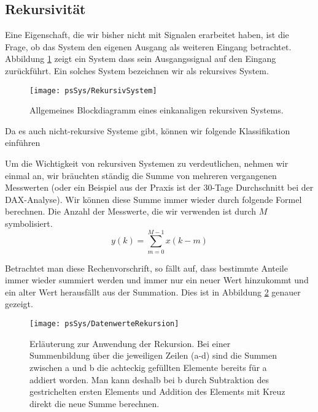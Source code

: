

\subsection{Rekursivität \label{ssec:Rekursion}}
Eine Eigenschaft, die wir bisher nicht mit Signalen erarbeitet
haben, ist die Frage, ob das System den eigenen Ausgang als
weiteren Eingang betrachtet. Abbildung \ref{pic:RekursivSystem}
zeigt ein System
dass sein Ausgangssignal auf den Eingang zurückführt. Ein solches
System bezeichnen wir als rekursives System.

\begin{figure}[H]
\begin{center}
\texttt{[image: psSys/RekursivSystem]}
\caption{\label{pic:RekursivSystem} Allgemeines Blockdiagramm
eines einkanaligen rekursiven Systems.}
\end{center}
\end{figure}

Da es auch nicht-rekursive Systeme gibt, können wir folgende
Klassifikation einführen


Um die Wichtigkeit von rekursiven Systemen zu verdeutlichen,
nehmen wir einmal an, wir bräuchten ständig die Summe von mehreren
vergangenen Messwerten (oder ein Beispiel aus der Praxis ist der
30-Tage Durchschnitt bei der DAX-Analyse). Wir können diese Summe
immer wieder durch folgende Formel berechnen. Die Anzahl der
Messwerte, die wir verwenden ist durch $M$ symbolisiert.
\begin{equation}
y(k) = \sum_{m=0}^{M-1}x(k-m)
\end{equation}

Betrachtet man diese Rechenvorschrift, so fällt auf, dass
bestimmte Anteile immer wieder summiert werden und immer nur ein
neuer Wert hinzukommt und ein alter Wert herausfällt aus der
Summation. Dies ist in Abbildung \ref{pic:ErklaerungRekursion}
genauer gezeigt.

\begin{figure}[H]
\begin{center}
\texttt{[image: psSys/DatenwerteRekursion]}
\caption{\label{pic:ErklaerungRekursion} Erläuterung zur Anwendung
der Rekursion. Bei einer Summenbildung über die jeweiligen Zeilen
(a-d) sind die Summen zwischen a und b die achteckig gefüllten
Elemente bereits für a addiert worden. Man kann deshalb bei b
durch Subtraktion des gestrichelten ersten Elements und Addition
des Elements mit Kreuz direkt die neue Summe berechnen.}
\end{center}
\end{figure}

